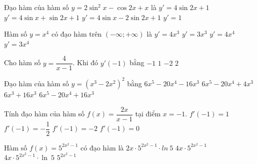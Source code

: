 \begin{ex}%
	Đạo hàm của hàm số $y=2\sin^2 x-\cos 2x+x$ là 
	\choice 
		{\True $y'=4\sin  2x+1$}
		{$y'=4\sin  x+\sin 2x+1$}
		{$y'=4\sin x -2\sin 2x+1$} 
		{$y'=1$} 
\end{ex}

\begin{ex}%
	Hàm số  $y=x^4$ có đạo hàm trên $\left(-\infty;+\infty \right)$ là
	\choice 
		{\True  $y'=4x^3$}
		{$y'=3x^3$} 
		 {$y'=4x^4$}
		 {$y'=3x^4$}
\end{ex}

\begin{ex}%
	Cho hàm số  $y=\dfrac{4}{x-1}$. Khi đó $y'(-1)$ bằng
	\choice 
		 {\True $-1$}
		{$1$} 
		 {$-2$}
		{$2$} 
\end{ex}

\begin{ex}%
	Đạo  hàm của hàm số $y=\left(x^3-2x^2\right)^2$ bằng
	\choice 
		 {$6x^5-20x^4-16x^3$}
		{$6x^5-20x^4+4x^3$} 
		 {$6x^3+16x^3$}
		{\True $6x^5-20x^4+16x^3$} 
\end{ex}

\begin{ex}%
	Tính đạo hàm của hàm số $f(x)=\dfrac{2x}{x-1}$ tại điểm  $x=-1$.
	 \choice
		 {$f'(-1)=1$}
		 {\True $f'(-1)=-\dfrac{1}{2}$}
		 {$f'(-1)=-2$}
		{$f'(-1)=0$} 
\end{ex}

\begin{ex}%
	 Hàm số $f(x)=5^{2x^{2}-1}$ có đạo hàm là
	 \choice
		{$2x  \cdot 5^{2x^{2}-1} \cdot ln~5$}
		{$4x \cdot 5^{2x^{2}-1}$} 
		{\True $4x \cdot  5^{2x^{2}-1} \cdot \ln~5$}
		 {$5^{2x^{2}-1}$}
\end{ex}

